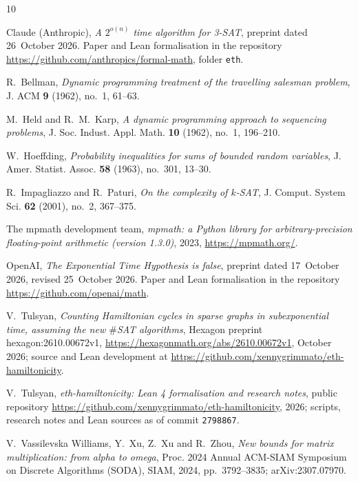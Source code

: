 \documentclass[10pt]{amsart}
\theoremstyle{definition}
\theoremstyle{remark}
\numberwithin{equation}{section}
\begin{document}
\begin{thebibliography}{10}

Claude (Anthropic), \emph{A $2^{o(n)}$ time algorithm for {3-SAT}}, preprint dated 26~October 2026.
Paper and Lean formalisation in the repository \url{https://github.com/anthropics/formal-math}, folder
\texttt{eth}.

R.~Bellman, \emph{Dynamic programming treatment of the travelling salesman problem}, J. ACM
\textbf{9} (1962), no.~1, 61--63.

M.~Held and R.~M.~Karp, \emph{A dynamic programming approach to sequencing problems}, J. Soc.
Indust. Appl. Math. \textbf{10} (1962), no.~1, 196--210.

W.~Hoeffding, \emph{Probability inequalities for sums of bounded random variables}, J. Amer.
Statist. Assoc. \textbf{58} (1963), no.~301, 13--30.

R.~Impagliazzo and R.~Paturi, \emph{On the complexity of $k$-{SAT}}, J. Comput. System Sci.
\textbf{62} (2001), no.~2, 367--375.

The mpmath development team, \emph{mpmath: a {P}ython library for arbitrary-precision
floating-point arithmetic (version 1.3.0)}, 2023, \url{https://mpmath.org/}.

OpenAI, \emph{The {E}xponential {T}ime {H}ypothesis is false}, preprint dated 17~October 2026, revised
25~October 2026. Paper and Lean formalisation in the repository \url{https://github.com/openai/math}.

V.~Tulsyan, \emph{Counting {H}amiltonian cycles in sparse graphs in subexponential time, assuming the
new $\#${SAT} algorithms}, Hexagon preprint hexagon:2610.00672v1,
\url{https://hexagonmath.org/abs/2610.00672v1}, October 2026; source and Lean development at
\url{https://github.com/xennygrimmato/eth-hamiltonicity}.

V.~Tulsyan, \emph{eth-hamiltonicity: {L}ean 4 formalisation and research notes}, public repository
\url{https://github.com/xennygrimmato/eth-hamiltonicity}, 2026; scripts, research notes and Lean
sources as of commit \texttt{2798867}.

V.~Vassilevska Williams, Y.~Xu, Z.~Xu and R.~Zhou, \emph{New bounds for matrix multiplication: from
alpha to omega}, Proc. 2024 Annual ACM-SIAM Symposium on Discrete Algorithms (SODA), SIAM, 2024,
pp.~3792--3835; arXiv:2307.07970.

\end{thebibliography}
\end{document}
